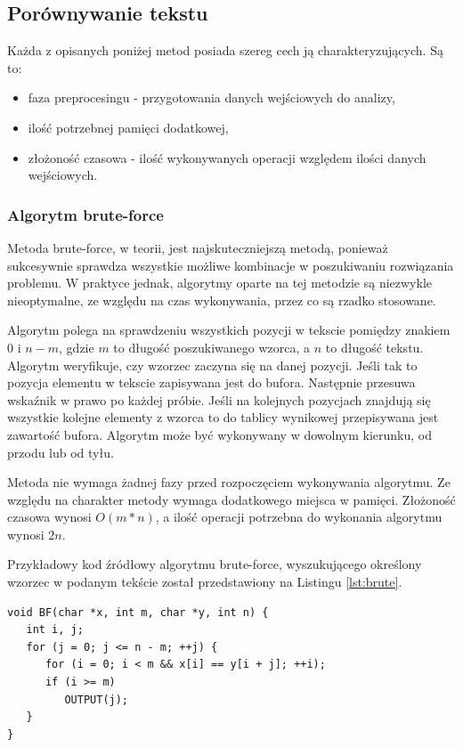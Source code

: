 \documentclass[a4paper,12pt,twoside]{article}
\begin{document}
\subsection{Porównywanie tekstu}

Każda z opisanych poniżej metod posiada szereg cech ją charakteryzujących. Są to:
\begin{itemize}
\item faza preprocesingu - przygotowania danych wejściowych do analizy,
\item ilość potrzebnej pamięci dodatkowej,
\item złożoność czasowa - ilość wykonywanych operacji względem ilości danych wejściowych.
\end{itemize}

\subsubsection{Algorytm brute-force}

Metoda brute-force, w teorii, jest najskuteczniejszą metodą, ponieważ sukcesywnie sprawdza wszystkie możliwe kombinacje w poszukiwaniu rozwiązania problemu. W praktyce jednak, algorytmy oparte na tej metodzie są niezwykle nieoptymalne, ze względu na czas wykonywania, przez co są rzadko stosowane.

Algorytm polega na sprawdzeniu wszystkich pozycji w tekscie pomiędzy znakiem $0$ i $n-m$, gdzie $m$ to długość poszukiwanego wzorca, a $n$ to długość tekstu. Algorytm weryfikuje, czy wzorzec zaczyna się na danej pozycji. Jeśli tak to pozycja elementu w tekscie zapisywana jest do bufora. Następnie przesuwa wskaźnik w prawo po każdej próbie. Jeśli na kolejnych pozycjach znajdują się wszystkie kolejne elementy z wzorca to do tablicy wynikowej przepisywana jest zawartość bufora. Algorytm może być wykonywany w dowolnym kierunku, od przodu lub od tyłu.

Metoda nie wymaga żadnej fazy przed rozpoczęciem wykonywania algorytmu. Ze względu na charakter metody wymaga dodatkowego miejsca w pamięci. Złożoność czasowa wynosi $O(m*n)$, a ilość operacji potrzebna do wykonania algorytmu wynosi $2n$.

Przykładowy kod źródłowy algorytmu brute-force, wyszukującego określony wzorzec w podanym tekście został przedstawiony na Listingu \ref{lst:brute}.
\\
\begin{lstlisting}[caption={Przykład implementacji algorytmu brute-force poszukujący wzorca $y$ w tekście $x$.},label={lst:brute}]
void BF(char *x, int m, char *y, int n) {
   int i, j;
   for (j = 0; j <= n - m; ++j) {
      for (i = 0; i < m && x[i] == y[i + j]; ++i);
      if (i >= m)
         OUTPUT(j);
   }
}
\end{lstlisting}
\end{document}

